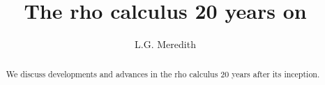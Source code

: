\def\lastname{Meredith}

\title{The rho calculus 20 years on}

\author{ L.G. Meredith }

\maketitle              %


\begin{abstract}

  We discuss developments and advances in the rho calculus 20 years after its inception.

\end{abstract}



